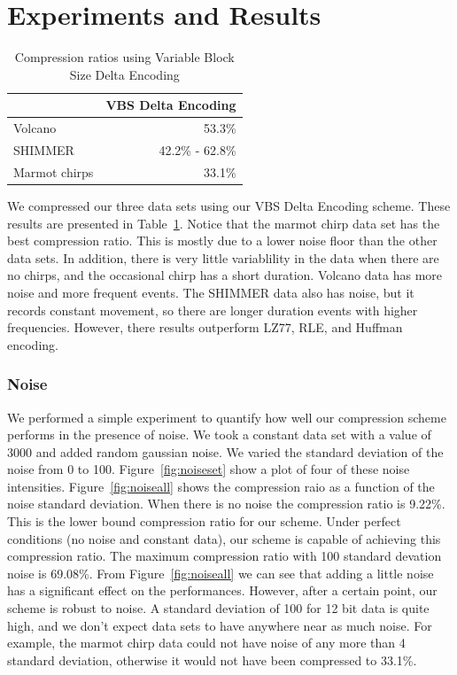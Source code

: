 \section{Experiments and Results}

\begin{table}
  \begin{center}
  \begin{tabular}{|l||r|}
    \hline
    & VBS Delta Encoding \\ \hline
    Volcano & 53.3\% \\ \hline
    SHIMMER & 42.2\% - 62.8\% \\ \hline
    Marmot chirps & 33.1\% \\ \hline
    
  \end{tabular}
  \end{center}
  \caption{Compression ratios using Variable Block Size Delta Encoding}
  \label{table:vbsde}
\end{table}

We compressed our three data sets using our VBS Delta Encoding
scheme. These results are presented in Table~\ref{table:vbsde}. Notice
that the marmot chirp data set has the best compression ratio. This is
mostly due to a lower noise floor than the other data sets. In
addition, there is very little variablility in the data when there are
no chirps, and the occasional chirp has a short duration. Volcano data
has more noise and more frequent events. The SHIMMER data also has
noise, but it records constant movement, so there are longer duration
events with higher frequencies. However, there results outperform
LZ77, RLE, and Huffman encoding. 

\subsubsection{Noise}

We performed a simple experiment to quantify how well our compression
scheme performs in the presence of noise. We took a constant data set
with a value of 3000 and added random gaussian noise. We varied the
standard deviation of the noise from 0 to
100. Figure~\ref{fig:noiseset} show a plot of four of these noise
intensities. Figure~\ref{fig:noiseall} shows the compression raio as a
function of the noise standard deviation. When there is no noise the
compression ratio is 9.22\%. This is the lower bound compression ratio
for our scheme. Under perfect conditions (no noise and constant data),
our scheme is capable of achieving this compression ratio. The maximum
compression ratio with 100 standard devation noise is 69.08\%. From
Figure~\ref{fig:noiseall} we can see that adding a little noise has a
significant effect on the performances. However, after a certain
point, our scheme is robust to noise. A standard deviation of 100 for
12 bit data is quite high, and we don't expect data sets to have
anywhere near as much noise. For example, the marmot chirp data could
not have noise of any more than 4 standard deviation, otherwise it would not have been compressed to 33.1\%. 

